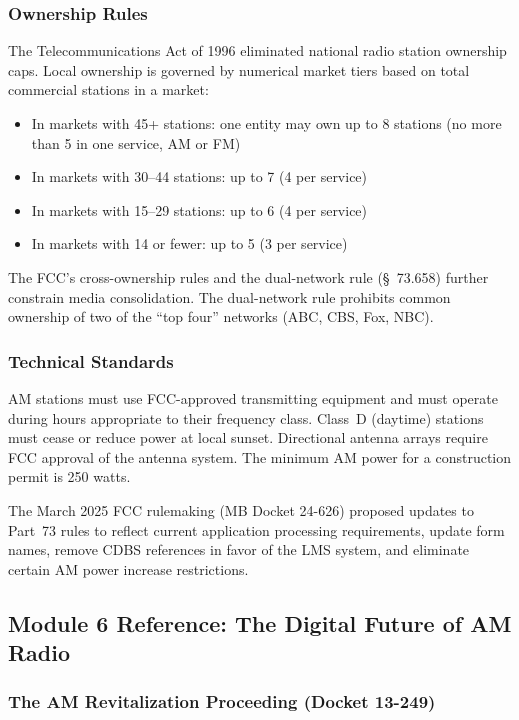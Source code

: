 \documentclass[11pt,letterpaper]{article}
\begin{document}
\begin{asciibox}
\subsubsection{Ownership Rules}

The Telecommunications Act of 1996 eliminated national radio station ownership caps. Local
ownership is governed by numerical market tiers based on total commercial stations in a market:
\begin{itemize}[leftmargin=*]
  \item In markets with 45+ stations: one entity may own up to 8 stations (no more than 5 in one service, AM or FM)
  \item In markets with 30--44 stations: up to 7 (4 per service)
  \item In markets with 15--29 stations: up to 6 (4 per service)
  \item In markets with 14 or fewer: up to 5 (3 per service)
\end{itemize}

The FCC's cross-ownership rules and the dual-network rule (\S~73.658) further constrain media
consolidation. The dual-network rule prohibits common ownership of two of the ``top four''
networks (ABC, CBS, Fox, NBC).

\subsubsection{Technical Standards}

AM stations must use FCC-approved transmitting equipment and must operate during hours
appropriate to their frequency class. Class~D (daytime) stations must cease or reduce power
at local sunset. Directional antenna arrays require FCC approval of the antenna system.
The minimum AM power for a construction permit is 250 watts.

The March 2025 FCC rulemaking (MB Docket 24-626) proposed updates to Part~73 rules to
reflect current application processing requirements, update form names, remove CDBS references
in favor of the LMS system, and eliminate certain AM power increase restrictions.

\subsection{Module 6 Reference: The Digital Future of AM Radio}

\subsubsection{The AM Revitalization Proceeding (Docket 13-249)}


\end{asciibox}
\end{document}
